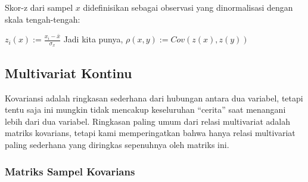\documentclass[
]{book}
\newenvironment{Shaded}{\begin{snugshade}}{\end{snugshade}}
\newcommand{\CommentTok}[1]{\textcolor[rgb]{0.56,0.35,0.01}{\textit{#1}}}
\newcommand{\KeywordTok}[1]{\textcolor[rgb]{0.13,0.29,0.53}{\textbf{#1}}}
\newcommand{\NormalTok}[1]{#1}
\newcommand{\OperatorTok}[1]{\textcolor[rgb]{0.81,0.36,0.00}{\textbf{#1}}}
\begin{document}
Skor-z dari sampel \(x\) didefinisikan sebagai observasi yang dinormalisasi dengan skala tengah-tengah:

\(z_i(x):=\frac{x_i-\bar{x}}{\sigma_x}\)
Jadi kita punya, \(\rho(x,y):=Cov(z(x),z(y))\)

\begin{Shaded}
\end{Shaded}

\begin{Shaded}
\end{Shaded}

\begin{Shaded}
\end{Shaded}

\hypertarget{multivariat-kontinu}{%
\subsection{Multivariat Kontinu}\label{multivariat-kontinu}}

Kovariansi adalah ringkasan sederhana dari hubungan antara dua variabel, tetapi tentu saja ini mungkin tidak mencakup keseluruhan ``cerita'' saat menangani lebih dari dua variabel. Ringkasan paling umum dari relasi multivariat adalah matriks kovarians, tetapi kami memperingatkan bahwa hanya relasi multivariat paling sederhana yang diringkas sepenuhnya oleh matriks ini.

\hypertarget{matriks-sampel-kovarians}{%
\subsubsection*{Matriks Sampel Kovarians}\label{matriks-sampel-kovarians}}
\end{document}
